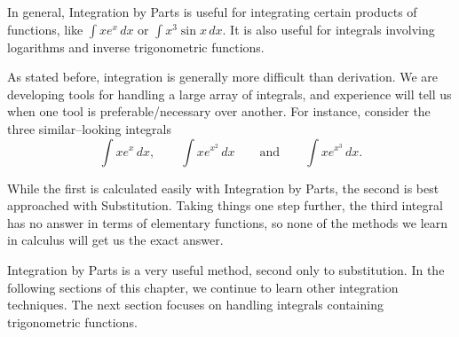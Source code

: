 In general, Integration by Parts is useful for integrating certain products of functions, like $\int x e^x\,dx$ or $\int x^3\sin x\,dx$.   It is also useful for integrals involving logarithms and inverse trigonometric functions.  

As stated before, integration is generally more difficult than derivation. We are developing tools for handling a large array of integrals, and experience will tell us when one tool is preferable/necessary over another. For instance, consider the three similar--looking integrals 
$$\int xe^x\,dx, \qquad  \int x e^{x^2}\,dx \qquad \text{and} \qquad \int xe^{x^3}\,dx.$$

While the first is calculated easily with Integration by Parts, the second is best approached with Substitution.  Taking things one step further, the third integral has no answer in terms of elementary functions, so none of the methods we learn in calculus will get us the exact answer.

Integration by Parts is a very useful method, second only to substitution. In the following sections of this chapter, we continue to learn other integration techniques. The next section focuses on handling integrals containing trigonometric functions. 




